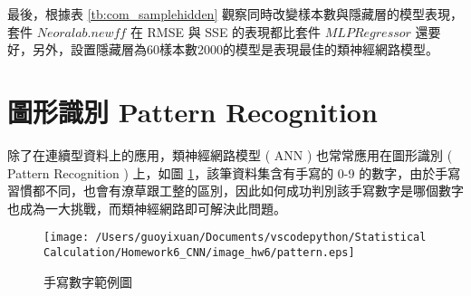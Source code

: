 \renewcommand\arraystretch{1.5}
\begin{table}[H]
\scriptsize
\setlength{\belowcaptionskip}{0pt}
\centering
\caption{機械手臂兩種套件同時改變樣本數與隱藏層的類神經網路模型好壞比較}\label{tb:com_samplehidden}
\end{table}

最後，根據表 \ref{tb:com_samplehidden} 觀察同時改變樣本數與隱藏層的模型表現，套件 $Neoralab.newff$ 在 RMSE 與 SSE 的表現都比套件 $MLPRegressor$ 還要好，另外，設置隱藏層為60樣本數2000的模型是表現最佳的類神經網路模型。

\section{圖形識別 Pattern Recognition}

除了在連續型資料上的應用，類神經網路模型 ( ANN ) 也常常應用在圖形識別 ( Pattern Recognition ) 上，如圖 \ref{fig:pattern}，該筆資料集含有手寫的 0-9 的數字，由於手寫習慣都不同，也會有潦草跟工整的區別，因此如何成功判別該手寫數字是哪個數字也成為一大挑戰，而類神經網路即可解決此問題。

\begin{figure}[H]
    \centering
        \texttt{[image: /Users/guoyixuan/Documents/vscodepython/Statistical Calculation/Homework6\_CNN/image\_hw6/pattern.eps]}
    \caption{手寫數字範例圖}
    \label{fig:pattern}
\end{figure}

